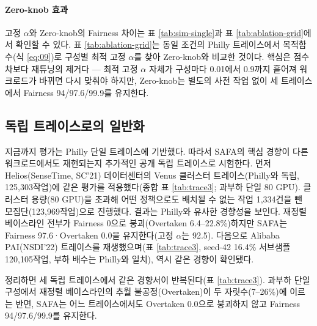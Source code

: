 \documentclass{ieeetj}
\begin{document}
\paragraph{Zero-knob 효과}
고정 $\alpha$와 Zero-knob의 Fairness 차이는 표 \ref{tab:sim-single}과 표 \ref{tab:ablation-grid}에서 확인할 수 있다. 표 \ref{tab:ablation-grid}는 동일 조건의 Philly 트레이스에서 목적함수(식 \eqref{eq:09})로 구성별 최적 고정 $\alpha$를 찾아 Zero-knob와 비교한 것이다. 핵심은 점수 차보다 재튜닝의 제거다 --- 최적 고정 $\alpha$ 자체가 구성마다 0.01에서 0.9까지 흩어져 워크로드가 바뀌면 다시 맞춰야 하지만, Zero-knob는 별도의 사전 작업 없이 세 트레이스에서 Fairness 94/97.6/99.9를 유지한다.


\subsection{독립 트레이스로의 일반화}\label{eval:robust:trace}
지금까지 평가는 Philly 단일 트레이스에 기반했다. 따라서 SAFA의 핵심 경향이 다른 워크로드에서도 재현되는지 추가적인 공개 독립 트레이스로 시험한다.
먼저 Helios\cite{hu2021helios}(SenseTime, SC'21) 데이터센터의 Venus 클러스터 트레이스(Philly와 독립, 125,303작업)에 같은 평가를 적용했다(종합 표 \ref{tab:trace3}; 과부하 단일 80 GPU). 클러스터 용량(80 GPU)을 초과해 어떤 정책으로도 배치될 수 없는 작업 1{,}334건을 뺀 모집단(123,969작업)으로 진행했다. 결과는 Philly와 유사한 경향성을 보인다. 재정렬 베이스라인 전부가 Fairness 0으로 붕괴(Overtaken 6.4--22.8\%)하지만 SAFA는 Fairness 97.6·Overtaken 0.0을 유지한다(고정 $\alpha$는 92.5). 다음으로 Alibaba PAI\cite{weng2022mlaas}(NSDI'22) 트레이스를 재생했으며(표 \ref{tab:trace3}, seed-42 16.4\% 서브샘플 120,105작업, 부하 배수는 Philly와 일치), 역시 같은 경향이 확인됐다.

정리하면 세 독립 트레이스에서 같은 경향서이 반복된다(표 \ref{tab:trace3}). 과부하 단일 구성에서 재정렬 베이스라인의 추월 불공정(Overtaken)이 두 자릿수(7--26\%)에 이르는 반면, SAFA는 어느 트레이스에서도 Overtaken 0.0으로 붕괴하지 않고 Fairness 94/97.6/99.9를 유지한다.
\end{document}
